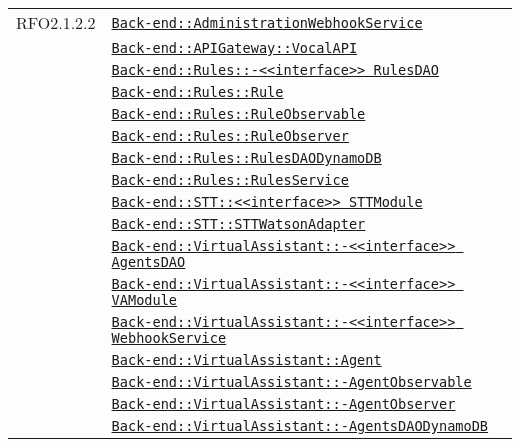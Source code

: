 \begin{longtable}{|>{\centering}m{3cm}|m{10cm}<{\centering}|}
RFO2.1.2.2 & \hyperref[Back-end::AdministrationWebhookService]{\texttt{Back-end::AdministrationWebhookService}}\\
& \hyperref[Back-end::APIGateway::VocalAPI]{\texttt{Back-end::APIGateway::VocalAPI}}\\
& \hyperref[Back-end::Rules::<<interface>> RulesDAO]{\texttt{Back-end::Rules::-\linebreak <<interface>> RulesDAO}}\\
& \hyperref[Back-end::Rules::Rule]{\texttt{Back-end::Rules::Rule}}\\
& \hyperref[Back-end::Rules::RuleObservable]{\texttt{Back-end::Rules::RuleObservable}}\\
& \hyperref[Back-end::Rules::RuleObserver]{\texttt{Back-end::Rules::RuleObserver}}\\
& \hyperref[Back-end::Rules::RulesDAODynamoDB]{\texttt{Back-end::Rules::RulesDAODynamoDB}}\\
& \hyperref[Back-end::Rules::RulesService]{\texttt{Back-end::Rules::RulesService}}\\
& \hyperref[Back-end::STT::<<interface>> STTModule]{\texttt{Back-end::STT::<<interface>> STTModule}}\\
& \hyperref[Back-end::STT::STTWatsonAdapter]{\texttt{Back-end::STT::STTWatsonAdapter}}\\
& \hyperref[Back-end::VirtualAssistant::<<interface>> AgentsDAO]{\texttt{Back-end::VirtualAssistant::-\linebreak <<interface>> AgentsDAO}}\\
& \hyperref[Back-end::VirtualAssistant::<<interface>> VAModule]{\texttt{Back-end::VirtualAssistant::-\linebreak <<interface>> VAModule}}\\
& \hyperref[Back-end::VirtualAssistant::<<interface>> WebhookService]{\texttt{Back-end::VirtualAssistant::-\linebreak <<interface>> WebhookService}}\\
& \hyperref[Back-end::VirtualAssistant::Agent]{\texttt{Back-end::VirtualAssistant::Agent}}\\
& \hyperref[Back-end::VirtualAssistant::AgentObservable]{\texttt{Back-end::VirtualAssistant::-\linebreak AgentObservable}}\\
& \hyperref[Back-end::VirtualAssistant::AgentObserver]{\texttt{Back-end::VirtualAssistant::-\linebreak AgentObserver}}\\
& \hyperref[Back-end::VirtualAssistant::AgentsDAODynamoDB]{\texttt{Back-end::VirtualAssistant::-\linebreak AgentsDAODynamoDB}}\\

\end{longtable}
